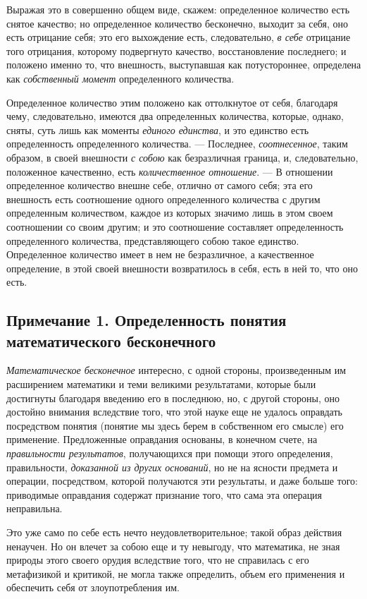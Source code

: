 {Выражая это в совершенно общем виде, скажем: определенное количество есть
снятое качество; но определенное количество бесконечно, выходит за себя,
оно есть отрицание себя; это его выхождение есть, следовательно,
{\em в себе} отрицание того отрицания, которому
подвергнуто качество, восстановление последнего; и положено именно то, что
внешность, выступавшая как потустороннее, определена как
{\em собственный момент} определенного количества.

Определенное количество этим положено как оттолкнутое от себя, благодаря
чему, следовательно, имеются два определенных количества, которые, однако,
сняты, суть лишь как моменты {\em единого единства}, и
это единство есть определенность определенного количества. — Последнее,
{\em соотнесенное}, таким образом, в своей внешности
{\em с собою} как безразличная граница, и,
следовательно, положенное качественно, есть
{\em количественное отношение}. — В отношении
определенное количество внешне себе, отлично от самого себя; эта его
внешность есть соотношение одного определенного количества с другим
определенным количеством, каждое из которых значимо лишь в этом своем
соотношении со своим другим; и это соотношение составляет определенность
определенного количества, представляющего собою такое единство.
Определенное количество имеет в нем не безразличное, а качественное
определение, в этой своей внешности возвратилось в себя, есть в ней то, что
оно есть.

\subsection*{Примечание 1. Определенность понятия математического
бесконечного}

{\em Математическое бесконечное} интересно, с одной
стороны, произведенным им расширением математики и теми великими
результатами, которые были достигнуты благодаря введению его в последнюю,
но, с другой стороны, оно достойно внимания вследствие того, что этой науке
еще не удалось оправдать посредством понятия (понятие мы здесь берем в
собственном его смысле) его применение. Предложенные оправдания основаны, в
конечном счете, на {\em правильности результатов},
получающихся при помощи этого определения, правильности,
{\em доказанной из других оснований}, но не на ясности
предмета и операции, посредством, которой получаются эти результаты, и даже
больше того: приводимые оправдания содержат признание того, что сама эта
операция неправильна.

Это уже само по себе есть нечто неудовлетворительное; такой образ действия
ненаучен. Но он влечет за собою еще и ту невыгоду, что математика, не зная
природы этого своего орудия вследствие того, что не справилась с его
метафизикой и критикой, не могла также определить, объем его применения и
обеспечить себя от злоупотребления им.

}
